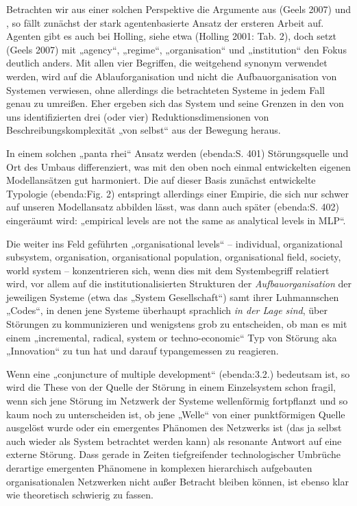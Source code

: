 \documentclass[11pt,a4paper]{article}
\begin{document}
Betrachten wir aus einer solchen Perspektive die Argumente aus (Geels 2007)
und \cite{Holling2000}, so fällt zunächst der stark agentenbasierte Ansatz der
ersteren Arbeit auf. Agenten gibt es auch bei Holling, siehe etwa (Holling
2001: Tab. 2), doch setzt (Geels 2007) mit „agency“, „regime“, „organisation“
und „institution“ den Fokus deutlich anders. Mit allen vier Begriffen, die
weitgehend synonym verwendet werden, wird auf die Ablauforganisation und nicht
die Aufbauorganisation von Systemen verwiesen, ohne allerdings die
betrachteten Systeme in jedem Fall genau zu umreißen. Eher ergeben sich das
System und seine Grenzen in den von uns identifizierten drei (oder vier)
Reduktionsdimensionen von Beschreibungskomplexität „von selbst“ aus der
Bewegung heraus.

In einem solchen „panta rhei“ Ansatz werden (ebenda:S. 401) Störungsquelle und
Ort des Umbaus differenziert, was mit den oben noch einmal entwickelten
eigenen Modellansätzen gut harmoniert. Die auf dieser Basis zunächst
entwickelte Typologie (ebenda:Fig. 2) entspringt allerdings einer Empirie, die
sich nur schwer auf unseren Modellansatz abbilden lässt, was dann auch später
(ebenda:S. 402) eingeräumt wird: „empirical levels are not the same as
analytical levels in MLP“.

Die weiter ins Feld geführten „organisational levels“ -- individual,
organizational subsystem, organisation, organisational population,
organisational field, society, world system -- konzentrieren sich, wenn dies
mit dem Systembegriff relatiert wird, vor allem auf die institutionalisierten
Strukturen der \emph{Aufbauorganisation} der jeweiligen Systeme (etwa das
„System Gesellschaft“) samt ihrer Luhmannschen „Codes“, in denen jene Systeme
überhaupt sprachlich \emph{in der Lage sind}, über Störungen zu kommunizieren
und wenigstens grob zu entscheiden, ob man es mit einem „incremental, radical,
system or techno-economic“ Typ von Störung aka „Innovation“ zu tun hat und
darauf typangemessen zu reagieren.

Wenn eine „conjuncture of multiple development“ (ebenda:3.2.)  bedeutsam ist,
so wird die These von der Quelle der Störung in einem Einzelsystem schon
fragil, wenn sich jene Störung im Netzwerk der Systeme wellenförmig
fortpflanzt und so kaum noch zu unterscheiden ist, ob jene „Welle“ von einer
punktförmigen Quelle ausgelöst wurde oder ein emergentes Phänomen des
Netzwerks ist (das ja selbst auch wieder als System betrachtet werden kann)
als resonante Antwort auf eine externe Störung. Dass gerade in Zeiten
tiefgreifender technologischer Umbrüche derartige emergenten Phänomene in
komplexen hierarchisch aufgebauten organisationalen Netzwerken nicht außer
Betracht bleiben können, ist ebenso klar wie theoretisch schwierig zu fassen.
\end{document}
